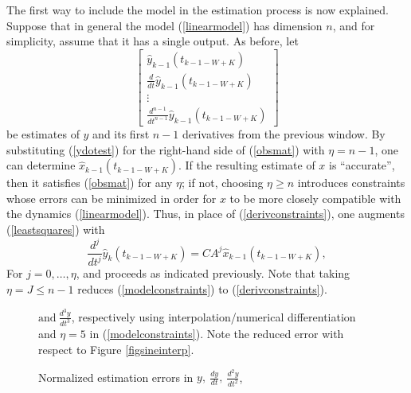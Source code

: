 The first way to include the model in the estimation process is now
explained.  Suppose that in general the model (\ref{linearmodel}) has dimension
$n$, and for simplicity, assume that it has a single output.
As before, let
\begin{equation}
\left[ \begin{array}{r} 
\hat{y}_{k-1}(t_{k-1-W+K}) \\
\frac{d}{dt} \hat{y}_{k-1}(t_{k-1-W+K}) \\ 
\vdots \\ 
\frac{d^{n-1}}{dt^{n-1}} \hat{y}_{k-1}(t_{k-1-W+K})
\end{array} \right]
\label{ydotest}
\end{equation}
be estimates of $y$ and its first $n-1$ derivatives from the previous window.
By substituting (\ref{ydotest}) for the right-hand side of (\ref{obsmat}) with
$\eta = n-1$, one can
determine $\hat{x}_{k-1}(t_{k-1-W+K})$. 
If the resulting estimate of $x$ is ``accurate'', then it satisfies (\ref{obsmat}) for
any $\eta$; if not, choosing $\eta \ge n$ introduces constraints whose
errors can be minimized in order for $x$ to be more closely compatible
with the dynamics (\ref{linearmodel}).  Thus, in place of
(\ref{derivconstraints}),
one augments (\ref{leastsquares}) with
\begin{equation}
\frac{d^j}{dt^j} \hat{y}_k(t_{k-1-W+K}) = CA^j  \hat{x}_{k-1}(t_{k-1-W+K}),
\label{modelconstraints}
\end{equation}
For $j=0, \ldots, \eta$, and proceeds as indicated previously.  
Note that taking $\eta =J \le n-1$ reduces 
(\ref{modelconstraints}) to (\ref{derivconstraints}).



\begin{figure}[hbt]
\centerline{}
\smallskip
\caption{\small Normalized estimation errors in $y, \ \frac{dy}{dt}, \
\frac{d^2y}{dt^2}$,}
$ \mbox{and} \
\frac{d^3y}{dt^3}$, respectively using interpolation/numerical differentiation
and $\eta=5$ in (\protect\ref{modelconstraints}).  Note the reduced error with respect to
Figure \protect\ref{figsineinterp}. 
\label{figsinesplineorder5}
\end{figure}


